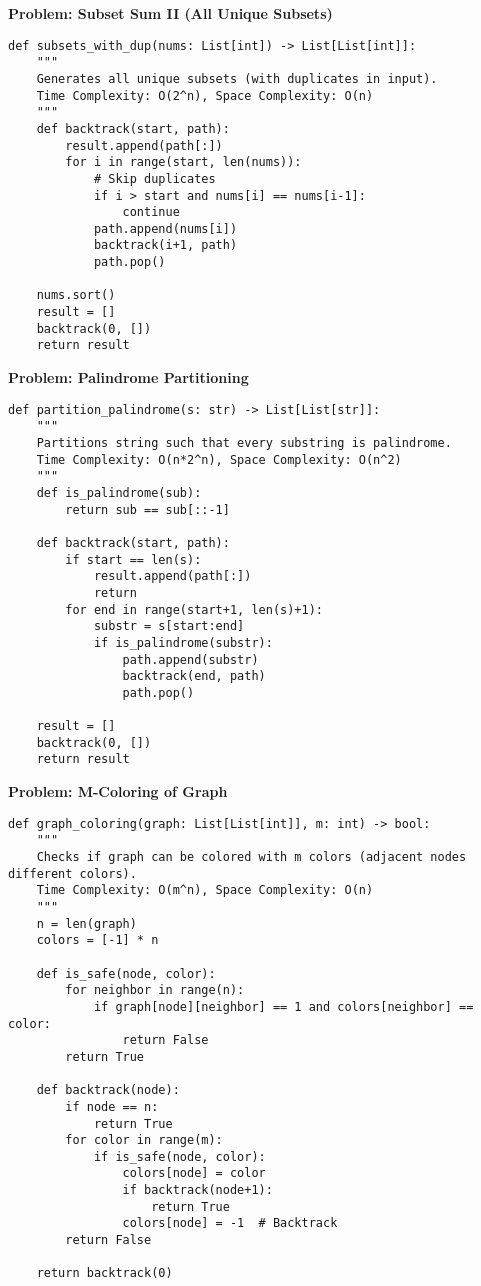 \noindent\textbf{Problem: Subset Sum II (All Unique Subsets)}
\begin{verbatim}
def subsets_with_dup(nums: List[int]) -> List[List[int]]:
    """
    Generates all unique subsets (with duplicates in input).
    Time Complexity: O(2^n), Space Complexity: O(n)
    """
    def backtrack(start, path):
        result.append(path[:])
        for i in range(start, len(nums)):
            # Skip duplicates
            if i > start and nums[i] == nums[i-1]:
                continue
            path.append(nums[i])
            backtrack(i+1, path)
            path.pop()
            
    nums.sort()
    result = []
    backtrack(0, [])
    return result
\end{verbatim}

\noindent\textbf{Problem: Palindrome Partitioning}
\begin{verbatim}
def partition_palindrome(s: str) -> List[List[str]]:
    """
    Partitions string such that every substring is palindrome.
    Time Complexity: O(n*2^n), Space Complexity: O(n^2)
    """
    def is_palindrome(sub):
        return sub == sub[::-1]
        
    def backtrack(start, path):
        if start == len(s):
            result.append(path[:])
            return
        for end in range(start+1, len(s)+1):
            substr = s[start:end]
            if is_palindrome(substr):
                path.append(substr)
                backtrack(end, path)
                path.pop()
                
    result = []
    backtrack(0, [])
    return result
\end{verbatim}

\noindent\textbf{Problem: M-Coloring of Graph}
\begin{verbatim}
def graph_coloring(graph: List[List[int]], m: int) -> bool:
    """
    Checks if graph can be colored with m colors (adjacent nodes different colors).
    Time Complexity: O(m^n), Space Complexity: O(n)
    """
    n = len(graph)
    colors = [-1] * n
    
    def is_safe(node, color):
        for neighbor in range(n):
            if graph[node][neighbor] == 1 and colors[neighbor] == color:
                return False
        return True
        
    def backtrack(node):
        if node == n:
            return True
        for color in range(m):
            if is_safe(node, color):
                colors[node] = color
                if backtrack(node+1):
                    return True
                colors[node] = -1  # Backtrack
        return False
        
    return backtrack(0)
\end{verbatim}

% 
